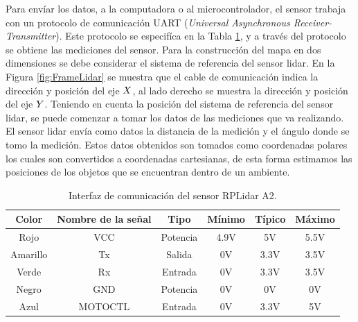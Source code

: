 Para envíar los datos, a la computadora o al microcontrolador, el sensor trabaja con un 
protocolo de comunicación UART (\textit{Universal Asynchronous Receiver-Transmitter}). Este 
protocolo se especifíca en la Tabla \ref{tbl:comunicacion}, y a través del protocolo se 
obtiene las mediciones del sensor. Para la construcción del mapa en dos dimensiones se 
debe considerar el sistema de referencia del sensor lidar. En la Figura \ref{fig:FrameLidar} 
se muestra que el cable de comunicación indica la dirección y posición del eje $\mathnormal X$, al 
lado derecho se muestra la dirección y posición del eje $\mathnormal Y$. Teniendo en cuenta la 
posición del sistema de referencia del sensor lidar, se puede comenzar a tomar los datos de 
las mediciones que va realizando. El sensor lidar envía como datos la distancia de la medición y 
el ángulo donde se tomo la medición. Estos datos obtenidos son tomados como coordenadas polares 
los cuales son convertidos a coordenadas cartesianas, de esta forma estimamos las posiciones de 
los objetos que se encuentran dentro de un ambiente.


\begin{table}[htbp]
\begin{center}
\begin{tabular}{|c|c|c|c|c|c|}
	\hline
	Color & Nombre de la señal & Tipo & Mínimo & Típico & Máximo \\ 
	\hline \hline
	Rojo & VCC & Potencia & 4.9V & 5V & 5.5V \\ \hline
	Amarillo & Tx & Salida & 0V & 3.3V & 3.5V \\ \hline
	Verde & Rx & Entrada & 0V & 3.3V & 3.5V \\ \hline
	Negro & GND & Potencia & 0V & 0V & 0V \\ \hline
	Azul & MOTOCTL & Entrada & 0V & 3.3V & 5V \\ \hline
\end{tabular}
	\caption{Interfaz de comunicación del sensor RPLidar A2.}
	\label{tbl:comunicacion}
\end{center}
\end{table}


